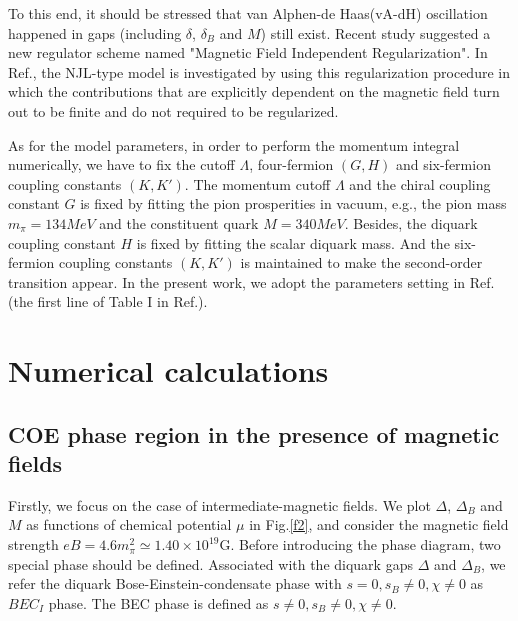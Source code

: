 \documentclass[prd, showpacs,nofootinbib,amsmath,amssymb,12pt]{revtex4}
\begin{document}
To this end, it should be stressed that van Alphen-de Haas(vA-dH) oscillation happened in gaps (including $\delta$, $\delta_B$ and $M$) still exist.
Recent study suggested a new regulator scheme named "Magnetic Field Independent Regularization"\cite{allen2015magnetized}.
In Ref.\cite{allen2015magnetized}, the NJL-type model is investigated by using this regularization procedure in which the contributions that are explicitly dependent on the magnetic field turn out to be finite and do not required to be regularized. 

As for the model parameters, in order to perform the momentum integral numerically, we have to fix the cutoff $\Lambda$, 
four-fermion $(G,H)$ and six-fermion coupling constants $(K, K')$.
The momentum cutoff $\Lambda$ and the chiral coupling constant $G$ is fixed by fitting the pion prosperities in vacuum, e.g.,
the pion mass $m_\pi = 134 MeV$ and the constituent quark $M = 340 MeV$.
Besides, the diquark coupling constant $H$ is fixed by fitting the scalar diquark mass.
And the six-fermion coupling constants $(K, K')$ is maintained to make the second-order transition appear.
In the present work, we adopt the parameters setting in Ref.\cite{abuki2010nambu} (the first line of Table I in Ref.\cite{abuki2010nambu}).

\section{Numerical calculations}
\subsection{COE phase region in the presence of magnetic fields}
\label{sec:3a}
Firstly, we focus on the case of intermediate-magnetic fields. 
We plot  $\Delta$, $\Delta_{B}$ and $M$ as functions of chemical potential $\mu$ in Fig.\ref{f2}, 
and consider the magnetic field strength $eB=4.6m^2_\pi \simeq 1.40\times10^{19}$G.
Before introducing the phase diagram, two special phase should be defined.
Associated with the diquark gaps $\Delta$ and $\Delta_B$, 
we refer the diquark Bose-Einstein-condensate phase with $s=0, s_B\neq 0, \chi \neq 0$ as $BEC_I$ phase.
The BEC phase is defined as $s \neq 0, s_B \neq 0, \chi \neq 0$.
\end{document}
